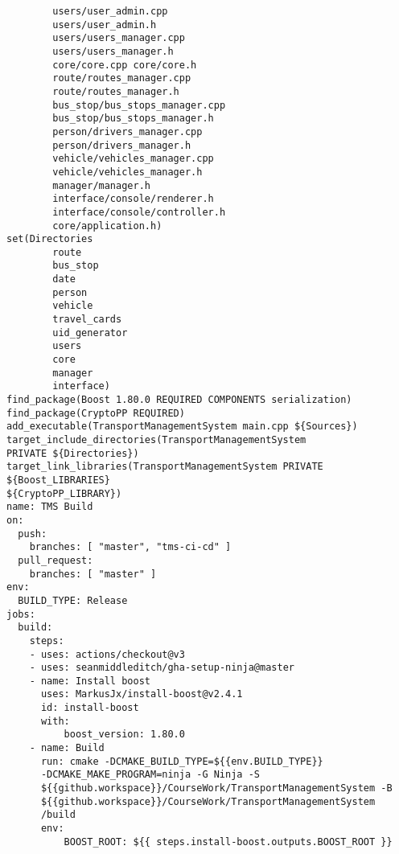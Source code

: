 \begin{verbatim}
        users/user_admin.cpp
        users/user_admin.h
        users/users_manager.cpp
        users/users_manager.h
        core/core.cpp core/core.h
        route/routes_manager.cpp
        route/routes_manager.h
        bus_stop/bus_stops_manager.cpp
        bus_stop/bus_stops_manager.h
        person/drivers_manager.cpp
        person/drivers_manager.h
        vehicle/vehicles_manager.cpp
        vehicle/vehicles_manager.h
        manager/manager.h
        interface/console/renderer.h
        interface/console/controller.h
        core/application.h)
set(Directories
        route
        bus_stop
        date
        person
        vehicle
        travel_cards
        uid_generator
        users
        core
        manager
        interface)
find_package(Boost 1.80.0 REQUIRED COMPONENTS serialization)
find_package(CryptoPP REQUIRED)
add_executable(TransportManagementSystem main.cpp ${Sources})
target_include_directories(TransportManagementSystem 
PRIVATE ${Directories})
target_link_libraries(TransportManagementSystem PRIVATE 
${Boost_LIBRARIES} 
${CryptoPP_LIBRARY})
name: TMS Build
on:
  push:
    branches: [ "master", "tms-ci-cd" ]
  pull_request:
    branches: [ "master" ]
env:
  BUILD_TYPE: Release
jobs:
  build:
    steps:
    - uses: actions/checkout@v3
    - uses: seanmiddleditch/gha-setup-ninja@master
    - name: Install boost
      uses: MarkusJx/install-boost@v2.4.1
      id: install-boost
      with:
          boost_version: 1.80.0
    - name: Build
      run: cmake -DCMAKE_BUILD_TYPE=${{env.BUILD_TYPE}}
      -DCMAKE_MAKE_PROGRAM=ninja -G Ninja -S 
      ${{github.workspace}}/CourseWork/TransportManagementSystem -B  
      ${{github.workspace}}/CourseWork/TransportManagementSystem
      /build
      env:
          BOOST_ROOT: ${{ steps.install-boost.outputs.BOOST_ROOT }}
\end{verbatim}